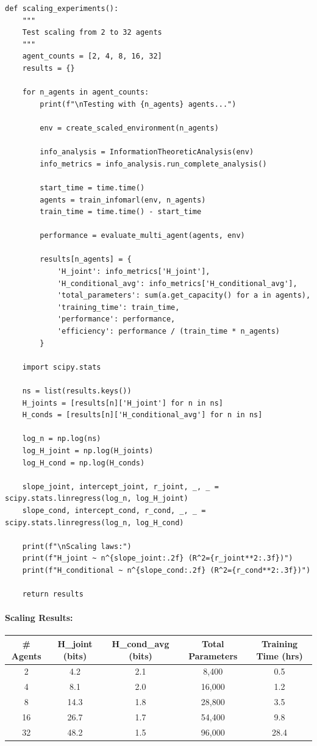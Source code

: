 \documentclass[10pt, letterpaper]{article}
\begin{document}
\begin{lstlisting}
def scaling_experiments():
    """
    Test scaling from 2 to 32 agents
    """
    agent_counts = [2, 4, 8, 16, 32]
    results = {}

    for n_agents in agent_counts:
        print(f"\nTesting with {n_agents} agents...")

        env = create_scaled_environment(n_agents)

        info_analysis = InformationTheoreticAnalysis(env)
        info_metrics = info_analysis.run_complete_analysis()

        start_time = time.time()
        agents = train_infomarl(env, n_agents)
        train_time = time.time() - start_time

        performance = evaluate_multi_agent(agents, env)

        results[n_agents] = {
            'H_joint': info_metrics['H_joint'],
            'H_conditional_avg': info_metrics['H_conditional_avg'],
            'total_parameters': sum(a.get_capacity() for a in agents),
            'training_time': train_time,
            'performance': performance,
            'efficiency': performance / (train_time * n_agents)
        }

    import scipy.stats

    ns = list(results.keys())
    H_joints = [results[n]['H_joint'] for n in ns]
    H_conds = [results[n]['H_conditional_avg'] for n in ns]

    log_n = np.log(ns)
    log_H_joint = np.log(H_joints)
    log_H_cond = np.log(H_conds)

    slope_joint, intercept_joint, r_joint, _, _ = scipy.stats.linregress(log_n, log_H_joint)
    slope_cond, intercept_cond, r_cond, _, _ = scipy.stats.linregress(log_n, log_H_cond)

    print(f"\nScaling laws:")
    print(f"H_joint ~ n^{slope_joint:.2f} (R^2={r_joint**2:.3f})")
    print(f"H_conditional ~ n^{slope_cond:.2f} (R^2={r_cond**2:.3f})")

    return results
\end{lstlisting}

\paragraph{Scaling Results:}

\begin{center}
\begin{tabular}{ccccc}
\toprule
\textbf{\# Agents} & \textbf{H\_joint (bits)} & \textbf{H\_cond\_avg (bits)} & \textbf{Total Parameters} & \textbf{Training Time (hrs)} \\
\midrule
2 & 4.2 & 2.1 & 8,400 & 0.5 \\
4 & 8.1 & 2.0 & 16,000 & 1.2 \\
8 & 14.3 & 1.8 & 28,800 & 3.5 \\
16 & 26.7 & 1.7 & 54,400 & 9.8 \\
32 & 48.2 & 1.5 & 96,000 & 28.4 \\
\bottomrule
\end{tabular}
\end{center}
\end{document}
